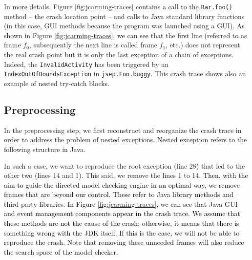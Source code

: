 \documentclass[times, doublespace]{smrauth}
\newcommand{\red}[1]{\textcolor{black}{#1}}
\begin{document}
In more details, Figure \ref{fig:jcarming-traces} contains a call to the {\tt Bar.foo()}
method -- the crash location point -- and calls to Java standard
library functions (in this case, GUI methods because the
program was launched using a GUI).
As shown in Figure \ref{fig:jcarming-traces}, we can see that the first line (referred to
as frame {\it $f_0$}, subsequently the next line is called frame {\it $f_1$}, etc.)
does not represent the real crash point but it is only the last
exception of a chain of exceptions. Indeed, the {\tt InvalidActivity}
has been triggered by an {\tt IndexOutOfBoundsException} in
{\tt jsep.Foo.buggy}. This crash trace shows also an example of nested try-catch blocks.



\subsection{Preprocessing}

In the preprocessing step, we first reconstruct and reorganize
the crash trace in order to address the problem of nested
exceptions. Nested exception refers to the following structure in Java. \\

\noindent{}

\vspace*{0.3cm}

In such a case, we want to reproduce the root exception (line 28)
that led to the other two (lines 14 and 1). This said, we remove the lines
1 to 14. \red{Then, with the aim to guide the directed model checking engine in an optimal way, we remove frames
that are beyond our control. These refer
to Java library methods and third
party libraries. In Figure \ref{fig:jcarming-traces}, we can see that Java GUI and
event management components appear in the crash trace. We
assume that these methods are not the cause of the crash;
otherwise, it means that there is something wrong with the JDK itself. If this is the case,  we will not be able to reproduce
the crash. Note that removing these unneeded frames will also
reduce the search space of the model checker.}
\end{document}
